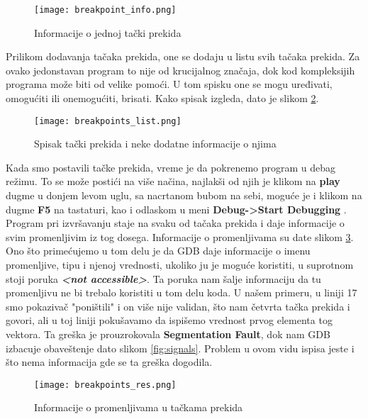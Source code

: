 \documentclass[a4paper]{article}
\begin{document}
\begin{figure}[h!]
\begin{center}
\texttt{[image: breakpoint\_info.png]}
\end{center}
\caption{Informacije o jednoj tački prekida}
\label{fig:point_info}
\end{figure}

Prilikom dodavanja tačaka prekida, one se dodaju u listu svih tačaka prekida. Za ovako jedonstavan program to 
nije od krucijalnog značaja, dok kod kompleksijih programa može biti od velike pomoći. U tom spisku one se mogu uređivati, 
omogućiti ili onemogućiti, brisati. Kako spisak izgleda, dato je slikom \ref{fig:points_list}.

\begin{figure}[h!]
\begin{center}
\texttt{[image: breakpoints\_list.png]}
\end{center}
\caption{Spisak tački prekida i neke dodatne informacije o njima}
\label{fig:points_list}
\end{figure}

Kada smo postavili tačke prekida, vreme je da pokrenemo program u debag režimu. To se može postići na više načina,
najlakši od njih je klikom na \textbf{play} dugme u donjem levom uglu, sa nacrtanom bubom na sebi, moguće je i klikom na 
dugme \textbf{F5} na tastaturi, kao i odlaskom u meni \textbf{Debug->Start Debugging} \cite{QT}.
\\

Program pri izvršavanju staje na svaku od tačaka prekida i daje informacije o svim promenljivim iz tog dosega. 
Informacije o promenljivama su date slikom \ref{fig:points_res}. 
Ono što primećujemo u tom delu je da GDB daje informacije o imenu promenljive, tipu i njenoj vrednosti, 
ukoliko ju je moguće koristiti, u suprotnom stoji poruka \textbf{\textit{<not accessible>}}. Ta poruka nam šalje
informaciju da tu promenljivu ne bi trebalo koristiti u tom delu koda. U našem primeru, u liniji 17 smo pokazivač "poništili"  
i on više nije validan, što nam četvrta tačka prekida i govori, ali u toj liniji pokušavamo da ispišemo vrednost prvog elementa
tog vektora. Ta greška je prouzrokovala \textbf{Segmentation Fault}, dok nam GDB izbacuje obaveštenje dato slikom \ref{fig:signals}.
Problem u ovom vidu ispisa jeste i što nema informacija gde se ta greška dogodila.

\begin{figure}[h!]
\begin{center}
\texttt{[image: breakpoints\_res.png]}
\end{center}
\caption{Informacije o promenljivama u tačkama prekida}
\label{fig:points_res}
\end{figure}
\end{document}
